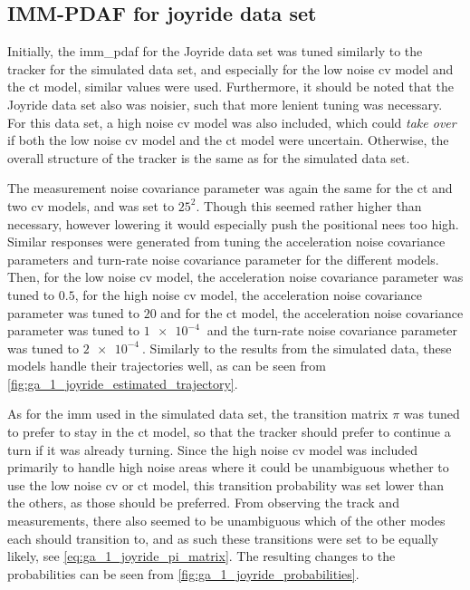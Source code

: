 \subsection{IMM-PDAF for joyride data set}
Initially, the \acrshort{imm_pdaf} for the Joyride data set was tuned similarly to the tracker for the simulated data set, and especially for the low noise \acrshort{cv} model and the \acrshort{ct} model, similar values were used. Furthermore, it should be noted that the Joyride data set also was noisier, such that more lenient tuning was necessary. For this data set, a high noise \acrshort{cv} model was also included, which could \textit{take over} if both the low noise \acrshort{cv} model and the \acrshort{ct} model were uncertain. Otherwise, the overall structure of the tracker is the same as for the simulated data set. 

The measurement noise covariance parameter was again the same for the \acrshort{ct} and two \acrshort{cv} models, and was set to $25^2$. Though this seemed rather higher than necessary, however lowering it would especially push the positional \acrshort{nees} too high. Similar responses were generated from tuning the acceleration noise covariance parameters and turn-rate noise covariance parameter for the different models. Then, for the low noise \acrshort{cv} model, the acceleration noise covariance parameter was tuned to $0.5$, for the high noise \acrshort{cv} model, the acceleration noise covariance parameter was tuned to $20$ and for the \acrshort{ct} model, the acceleration noise covariance parameter was tuned to $\SI{1e-4}{}$ and the turn-rate noise covariance parameter was tuned to $\SI{2e-4}{}$. Similarly to the results from the simulated data, these models handle their trajectories well, as can be seen from \cref{fig:ga_1_joyride_estimated_trajectory}. 

As for the \acrshort{imm} used in the simulated data set, the transition matrix $\pi$ was tuned to prefer to stay in the \acrshort{ct} model, so that the tracker should prefer to continue a turn if it was already turning. Since the high noise \acrshort{cv} model was included primarily to handle high noise areas where it could be unambiguous whether to use the low noise \acrshort{cv} or \acrshort{ct} model, this transition probability was set lower than the others, as those should be preferred. From observing the track and measurements, there also seemed to be unambiguous which of the other modes each should transition to, and as such these transitions were set to be equally likely, see \cref{eq:ga_1_joyride_pi_matrix}. The resulting changes to the probabilities can be seen from \cref{fig:ga_1_joyride_probabilities}. 

